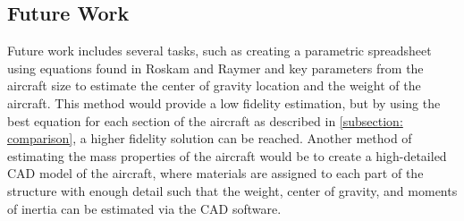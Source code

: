 \subsection{Future Work}
Future work includes several tasks, such as creating a parametric spreadsheet using equations found in Roskam and Raymer and key parameters from the aircraft size to estimate the center of gravity location and the weight of the aircraft. This method would provide a low fidelity estimation, but by using the best equation for each section of the aircraft as described in \ref{subsection: comparison}, a higher fidelity solution can be reached. Another method of estimating the mass properties of the aircraft would be to create a high-detailed CAD model of the aircraft, where materials are assigned to each part of the structure with enough detail such that the weight, center of gravity, and moments of inertia can be estimated via the CAD software. 







